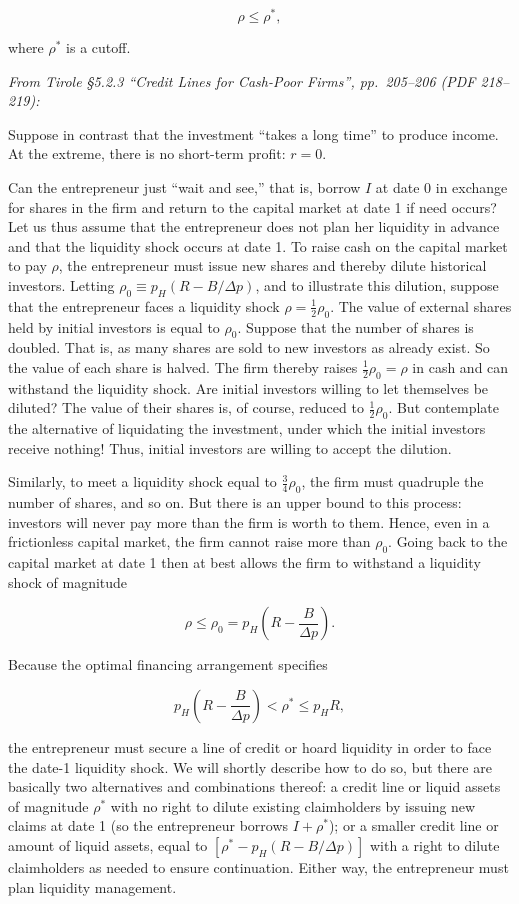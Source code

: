 \documentclass[11pt,a4paper]{article}
\begin{document}
\[\rho \leqslant \rho^*,\]

where \(\rho^*\) is a cutoff.

\emph{From Tirole §5.2.3 ``Credit Lines for Cash-Poor Firms'', pp.~205--206 (PDF 218--219):}

Suppose in contrast that the investment ``takes a long time'' to produce income. At the extreme,
there is no short-term profit: \(r = 0\).

Can the entrepreneur just ``wait and see,'' that is, borrow \(I\) at date 0 in exchange for shares
in the firm and return to the capital market at date 1 if need occurs? Let us thus assume that the
entrepreneur does not plan her liquidity in advance and that the liquidity shock occurs at date 1.
To raise cash on the capital market to pay \(\rho\), the entrepreneur must issue new shares and
thereby dilute historical investors. Letting \(\rho_0 \equiv p_H(R - B/\Delta p)\), and to
illustrate this dilution, suppose that the entrepreneur faces a liquidity shock
\(\rho = \frac12\rho_0\). The value of external shares held by initial investors is equal to
\(\rho_0\). Suppose that the number of shares is doubled. That is, as many shares are sold to new
investors as already exist. So the value of each share is halved. The firm thereby raises
\(\frac12\rho_0 = \rho\) in cash and can withstand the liquidity shock. Are initial investors
willing to let themselves be diluted? The value of their shares is, of course, reduced to
\(\frac12\rho_0\). But contemplate the alternative of liquidating the investment, under which the
initial investors receive nothing! Thus, initial investors are willing to accept the dilution.

Similarly, to meet a liquidity shock equal to \(\frac34\rho_0\), the firm must quadruple the number
of shares, and so on. But there is an upper bound to this process: investors will never pay more
than the firm is worth to them. Hence, even in a frictionless capital market, the firm cannot raise
more than \(\rho_0\). Going back to the capital market at date 1 then at best allows the firm to
withstand a liquidity shock of magnitude

\[\rho \leqslant \rho_0 = p_H\left(R - \frac{B}{\Delta p}\right).\]

Because the optimal financing arrangement specifies

\[p_H\left(R - \frac{B}{\Delta p}\right) < \rho^* \leqslant p_HR,\]

the entrepreneur must secure a line of credit or hoard liquidity in order to face the date-1
liquidity shock. We will shortly describe how to do so, but there are basically two alternatives and
combinations thereof: a credit line or liquid assets of magnitude \(\rho^*\) with no right to dilute
existing claimholders by issuing new claims at date 1 (so the entrepreneur borrows \(I + \rho^*\));
or a smaller credit line or amount of liquid assets, equal to \([\rho^* - p_H(R - B/\Delta p)]\)
with a right to dilute claimholders as needed to ensure continuation. Either way, the entrepreneur
must plan liquidity management.
\end{document}
